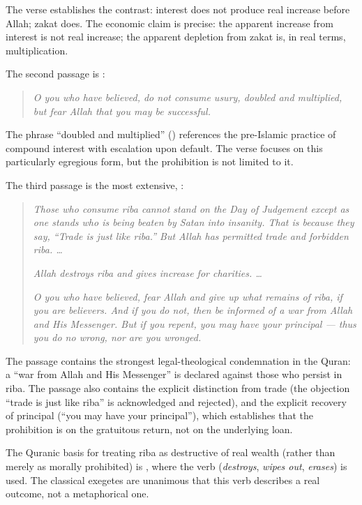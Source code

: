 The verse establishes the contrast: interest does not produce real
increase before Allah; zakat does. The economic claim is precise:
the apparent increase from interest is not real increase; the
apparent depletion from zakat is, in real terms, multiplication.

The second passage is :

\begin{quote}
\textit{O you who have believed, do not consume usury, doubled and
multiplied, but fear Allah that you may be successful.}
\end{quote}

The phrase ``doubled and multiplied'' ()
references the pre-Islamic practice of compound interest with
escalation upon default. The verse focuses on this particularly
egregious form, but the prohibition is not limited to it.

The third passage is the most extensive, :

\begin{quote}
\textit{Those who consume riba cannot stand on the Day of Judgement
except as one stands who is being beaten by Satan into insanity.
That is because they say, ``Trade is just like riba.'' But Allah has
permitted trade and forbidden riba. \dots}

\textit{Allah destroys riba and gives increase for charities. \dots}

\textit{O you who have believed, fear Allah and give up what
remains of riba, if you are believers. And if you do not, then be
informed of a war from Allah and His Messenger. But if you repent,
you may have your principal --- thus you do no wrong, nor are you
wronged.}
\end{quote}

The passage contains the strongest legal-theological condemnation in
the Quran: a ``war from Allah and His Messenger'' is declared against
those who persist in riba. The passage also contains the explicit
distinction from trade (the objection ``trade is just like riba''
is acknowledged and rejected), and the explicit recovery of
principal (``you may have your principal''), which establishes that
the prohibition is on the gratuitous return, not on the underlying
loan.

The Quranic basis for treating riba as destructive of real wealth
(rather than merely as morally prohibited) is , where
the verb  (\textit{destroys}, \textit{wipes out},
\textit{erases}) is used. The classical exegetes are unanimous that
this verb describes a real outcome, not a metaphorical one.

